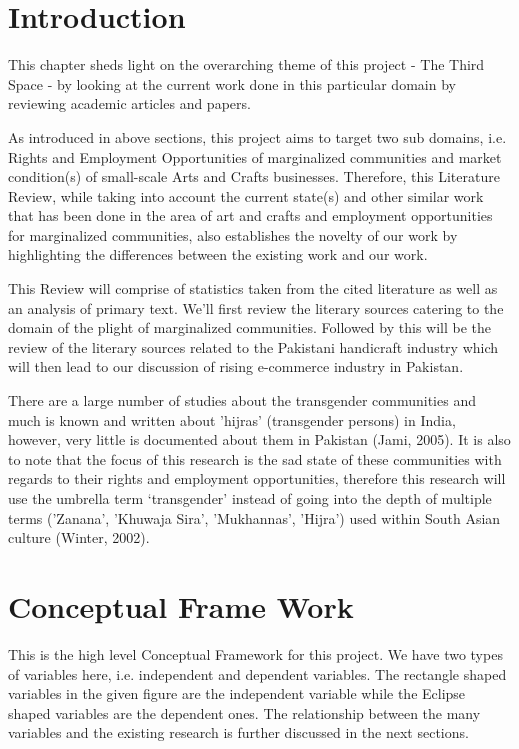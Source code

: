     
\section{Introduction}

This chapter sheds light on the overarching theme of this project - The Third Space - by looking at the current work done in this particular domain by reviewing academic articles and papers.

As introduced in above sections, this project aims to target two sub domains, i.e. Rights and Employment Opportunities of marginalized communities and market condition(s) of small-scale Arts and Crafts businesses. Therefore, this Literature Review, while taking into account the current state(s) and other similar work that has been done in the area of art and crafts and employment opportunities for marginalized communities, also establishes the novelty of our work by highlighting the differences between the existing work and our work.

This Review will comprise of statistics taken from the cited literature as well as an analysis of primary text. We'll first review the literary sources catering to the domain of the plight of marginalized communities. Followed by this will be the review of the literary sources related to the Pakistani handicraft industry which will then lead to our discussion of rising e-commerce industry in Pakistan.

There are a large number of studies about the transgender communities and much is known and written about 'hijras' (transgender persons) in India, however, very little is documented about them in Pakistan (Jami, 2005). It is also to note that the focus of this research is the sad state of these communities with regards to their rights and employment opportunities, therefore this research will use the umbrella term `transgender' instead of going into the depth of multiple terms ('Zanana', 'Khuwaja Sira', 'Mukhannas', 'Hijra') used within South Asian culture (Winter, 2002). 

\section{Conceptual Frame Work}

This is the high level Conceptual Framework for this project. We have two types of variables here, i.e. independent and dependent variables. The rectangle shaped variables in the given figure are the independent variable while the Eclipse shaped variables are the dependent ones. The relationship between the many variables and the existing research is further discussed in the next sections. 

